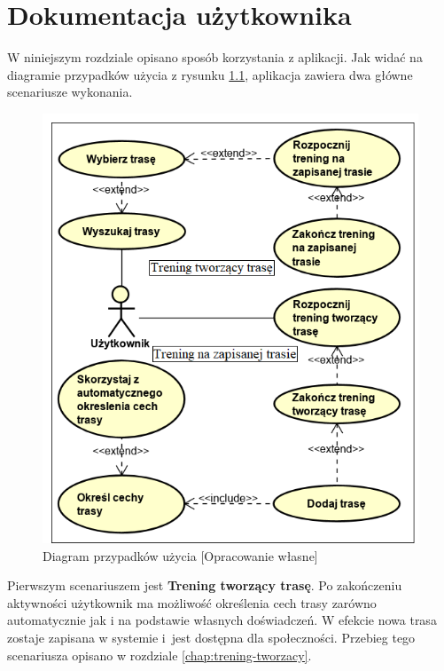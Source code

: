 \chapter{Dokumentacja użytkownika}\label{chap:dokumentacja-uzytkownika}
W niniejszym rozdziale opisano sposób korzystania z aplikacji. Jak widać na diagramie przypadków użycia z rysunku \ref{image:przypadki-uzycia}, aplikacja zawiera dwa główne scenariusze wykonania.
\begin{figure}[h]\label{fig:xamarin_model}
\begin{center}
\includegraphics{img/przypadki-uzycia.png}
\caption{Diagram przypadków użycia [Opracowanie własne]}\label{image:przypadki-uzycia}
\end{center}
\end{figure}

Pierwszym scenariuszem jest \textbf{Trening tworzący trasę}. Po zakończeniu aktywności użytkownik ma możliwość określenia cech trasy zarówno automatycznie jak i na podstawie własnych doświadczeń. W efekcie nowa trasa zostaje zapisana w systemie i~jest dostępna dla społeczności. Przebieg tego scenariusza opisano w rozdziale \ref{chap:trening-tworzacy}.

